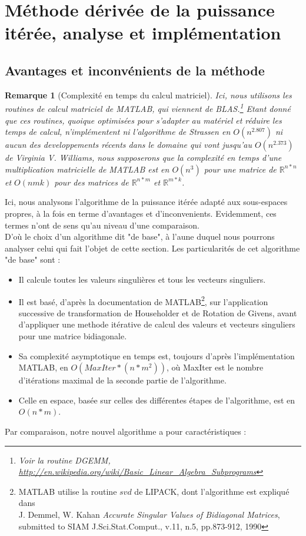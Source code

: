 \documentclass[a4paper,12pt]{article}
\newtheorem*{remark}{Remarque}
\begin{document}
\section{Méthode dérivée de la puissance itérée, analyse et implémentation}

    \subsection{Avantages et inconvénients de la méthode}

    \begin{remark}[Complexité en temps du calcul matriciel]
    Ici, nous utilisons les routines de calcul matriciel de MATLAB, qui viennent de BLAS.\footnote{Voir la routine DGEMM, \url{http://en.wikipedia.org/wiki/Basic_Linear_Algebra_Subprograms}} Etant donné que ces routines, quoique optimisées pour s'adapter au matériel et réduire les temps de calcul, n'implémentent ni l'algorithme de Strassen en $O(n^{2.807})$ ni aucun des developpements récents dans le domaine qui vont jusqu'au $O(n^{2.373})$ de Virginia V. Williams, nous supposerons que la complexité en temps d'une multiplication matricielle de MATLAB est en $O(n^3)$ pour une matrice de $\mathbb{R}^{n*n}$ et $O(nmk)$ pour des matrices de $\mathbb{R}^{n*m}$ et $\mathbb{R}^{m*k}$.
    \end{remark}

    Ici, nous analysons l'algorithme de la puissance itérée adapté aux sous-espaces propres, à la fois en terme d'avantages et d'inconvenients. Evidemment, ces termes n'ont de sens qu'au niveau d'une comparaison. \\
    D'où le choix d'un algorithme dit "de base", à l'aune duquel nous pourrons analyser celui qui fait l'objet de cette section.
    Les particularités de cet algorithme "de base" sont : \\

        \begin{itemize}
            \item Il calcule toutes les valeurs singulières et tous les vecteurs singuliers.
            \item Il est basé, d'après la documentation de MATLAB\footnote{MATLAB utilise la routine $svd$ de LIPACK, dont l'algorithme est expliqué dans \\    J. Demmel, W. Kahan \textit{Accurate Singular Values of Bidiagonal Matrices}, submitted to SIAM J.Sci.Stat.Comput., v.11, n.5, pp.873-912, 1990}, sur l'application successive de transformation de Householder et de Rotation de Givens, avant d'appliquer une methode itérative de calcul des valeurs et vecteurs singuliers pour une matrice bidiagonale.
            \item Sa complexité asymptotique en temps est, toujours d'après l'implémentation MATLAB, en $O(MaxIter*(n*m^2))$, où MaxIter est le nombre d'itérations maximal de la seconde partie de l'algorithme.
            \item Celle en espace, basée sur celles des différentes étapes de l'algorithme, est en $O(n*m)$.
        \end{itemize}
\bigskip
    Par comparaison, notre nouvel algorithme a pour caractéristiques : \\
\end{document}
